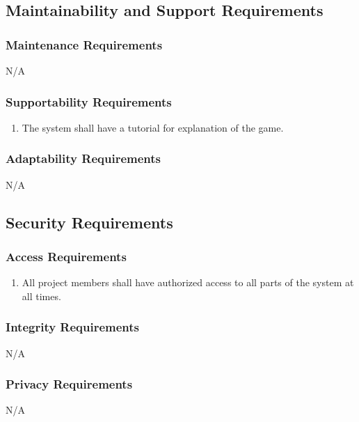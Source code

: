 \documentclass[]{article}
\begin{document}
\subsection{Maintainability and Support Requirements}
\label{sub:maintainability_and_support_requirements}

\subsubsection{Maintenance Requirements}
\label{ssub:maintenance_requirements}
N/A

\subsubsection{Supportability Requirements}
\label{ssub:supportability_requirements}
\begin{enumerate}[start=1, label={MS\arabic*.}]
    \item The system shall have a tutorial for explanation of the game.
\end{enumerate}

\subsubsection{Adaptability Requirements}
\label{ssub:adaptability_requirements}
N/A

\subsection{Security Requirements}
\label{sub:security_requirements}

\subsubsection{Access Requirements}
\label{ssub:access_requirements}
\begin{enumerate}[start=1, label={SR\arabic*.}]
    \item All project members shall have authorized access to all parts of the 
    system at all times.
\end{enumerate}

\subsubsection{Integrity Requirements}
\label{ssub:integrity_requirements}
N/A

\subsubsection{Privacy Requirements}
\label{ssub:privacy_requirements}
N/A
\end{document}

